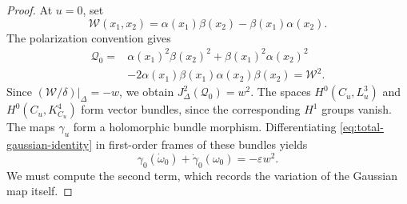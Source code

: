 \documentclass[11pt]{article}
\begin{document}
\begin{proof}
At $u=0$, set
\[
\mathcal W(x_1,x_2)=
\alpha(x_1)\beta(x_2)-\beta(x_1)\alpha(x_2).
\]
The polarization convention gives
\begin{equation}
\label{q0w2}
\begin{aligned}
\mathcal Q_0
={}&\alpha(x_1)^2\beta(x_2)^2+\beta(x_1)^2\alpha(x_2)^2\\
&-2\alpha(x_1)\beta(x_1)\alpha(x_2)\beta(x_2)
=\mathcal W^2.
\end{aligned}
\end{equation}
Since $(\mathcal W/\delta)|_\Delta=-w$, we obtain
$J_\Delta^2(\mathcal Q_0)=w^2$. The spaces $H^0(C_u,L_u^3)$ and $H^0(C_u,K_{C_u}^4)$ form vector
bundles, since the corresponding $H^1$ groups vanish. The maps
$\gamma_u$ form a holomorphic bundle morphism. Differentiating
\eqref{eq:total-gaussian-identity} in first-order frames of these
bundles yields
\begin{equation}
\label{eq:total-gaussian-derivative}
\gamma_0(\dot\omega_0)+\dot\gamma_0(\omega_0)
=-\varepsilon w^2.
\end{equation}
We must compute the second term, which records the variation of the
Gaussian map itself.


\end{proof}
\end{document}
